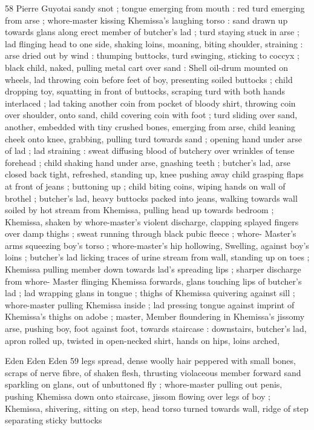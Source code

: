 58 Pierre Guyotai
sandy snot ; tongue emerging from mouth : red turd emerging from
arse ; whore-master kissing Khemissa’s laughing torso : sand drawn
up towards glans along erect member of butcher's lad ; turd staying
stuck in arse ; lad flinging head to one side, shaking loins, moaning,
biting shoulder, straining : arse dried out by wind : thumping
buttocks, turd swinging, sticking to coccyx ; black child, naked,
pulling metal cart over sand : Shell oil-drum mounted on wheels, lad
throwing coin before feet of boy, presenting soiled buttocks ; child
dropping toy, squatting in front of buttocks, scraping turd with both
hands interlaced ; lad taking another coin from pocket of bloody
shirt, throwing coin over shoulder, onto sand, child covering coin with
foot ; turd sliding over sand, another, embedded with tiny crushed
bones, emerging from arse, child leaning cheek onto knee, grabbing,
pulling turd towards sand ; opening hand under arse of lad ; lad
straining : sweat diffusing blood of butchery over wrinkles of tense
forehead ; child shaking hand under arse, gnashing teeth ; butcher's
lad, arse closed back tight, refreshed, standing up, knee pushing
away child grasping flaps at front of jeans ; buttoning up ; child
biting coins, wiping hands on wall of brothel ; butcher's lad, heavy
buttocks packed into jeans, walking towards wall soiled by hot stream
from Khemissa, pulling head up towards bedroom ; Khemissa, shaken
by whore-master’s violent discharge, clapping splayed fingers over
damp thighs ; sweat running through black pubic fleece ; whore-
Master's arms squeezing boy's torso ; whore-master's hip hollowing,
Swelling, against boy's loins ; butcher's lad licking traces of urine
stream from wall, standing up on toes ; Khemissa pulling member
down towards lad's spreading lips ; sharper discharge from whore-
Master flinging Khemissa forwards, glans touching lips of butcher's
lad ; lad wrapping glans in tongue ; thighs of Khemissa quivering
against sill ; whore-master pulling Khemissa inside ; lad pressing
tongue against imprint of Khemissa's thighs on adobe ; master,
Member floundering in Khemissa’s jissomy arse, pushing boy, foot
against foot, towards staircase : downstairs, butcher's lad, apron
rolled up, twisted in open-necked shirt, hands on hips, loins arched,

Eden Eden Eden 59
legs spread, dense woolly hair peppered with small bones, scraps of
nerve fibre, of shaken flesh, thrusting violaceous member forward
sand sparkling on glans, out of unbuttoned fly ; whore-master
pulling out penis, pushing Khemissa down onto staircase, jissom
flowing over legs of boy ; Khemissa, shivering, sitting on step, head
torso turned towards wall, ridge of step separating sticky buttocks

